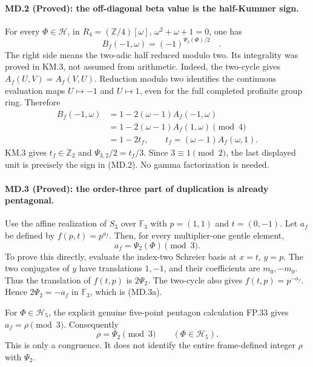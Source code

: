 \paragraph{MD.2 (Proved): the off-diagonal beta value is the half-Kummer sign.}
For every $\Phi\in\mathcal H$, in
$R_4=(\mathbb Z/4)[\omega]$, $\omega^2+\omega+1=0$, one has
\[
 \boxed{\quad B_f(-1,\omega)=(-1)^{\Psi_3(\Phi)/2}\quad}.
 \tag{MD.2}
\]
The right side means the two-adic half reduced modulo two.
Its integrality was proved in KM.3, not assumed from arithmetic.
Indeed, the two-cycle gives $A_f(U,V)=A_f(V,U)$.
Reduction modulo two identifies the continuous evaluation maps
$U\mapsto-1$ and $U\mapsto1$, even for the full completed
profinite group ring. Therefore
\[
\begin{split}
 B_f(-1,\omega)
 &=1-2(\omega-1)A_f(-1,\omega)\\
 &=1-2(\omega-1)A_f(1,\omega)\pmod4\\
 &=1-2t_f,
 \qquad t_f=(\omega-1)A_f(\omega,1).
\end{split}
\]
KM.3 gives $t_f\in\mathbb Z_2$ and $\Psi_{3,2}/2=t_f/3$.
Since $3\equiv1\pmod2$, the last displayed unit is precisely
the sign in (MD.2). No gamma factorization is needed.

\paragraph{MD.3 (Proved): the order-three part of duplication is already pentagonal.}
Use the affine realization of $S_3$ over $\mathbb F_3$ with
$p=(1,1)$ and $t=(0,-1)$. Let $a_f$ be defined by
$f(p,t)=p^{a_f}$. Then, for every multiplier-one gentle element,
\[
 a_f=\Psi_2(\Phi)\pmod3.
 \tag{MD.3a}
\]
To prove this directly, evaluate the index-two Schreier basis at
$x=t$, $y=p$. The two conjugates of $y$ have translations $1,-1$,
and their coefficients are $m_0,-m_0$. Thus the translation of
$f(t,p)$ is $2\Psi_2$. The two-cycle also gives
$f(t,p)=p^{-a_f}$. Hence $2\Psi_2=-a_f$ in $\mathbb F_3$,
which is (MD.3a).

For $\Phi\in\mathcal H_5$, the explicit genuine five-point
pentagon calculation FP.33 gives $a_f=\rho\pmod3$. Consequently
\[
 \rho=\Psi_2\pmod3\qquad(\Phi\in\mathcal H_5).
 \tag{MD.3b}
\]
This is only a congruence. It does not identify the entire
frame-defined integer $\rho$ with $\Psi_2$.

